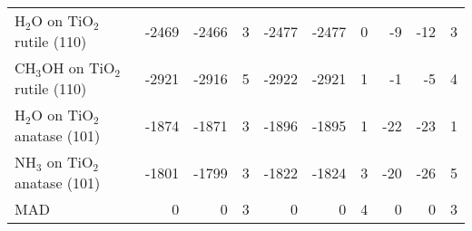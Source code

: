 \begin{table}
\begin{adjustbox}{center,max width=1\textwidth}
\begin{tabular}{lrrrrrrrrr}
H$_2$O on TiO$_2$ rutile (110) & -2469 & -2466 & 3 & -2477 & -2477 & 0 & -9 & -12 & 3 \\
CH$_3$OH on TiO$_2$ rutile (110) & -2921 & -2916 & 5 & -2922 & -2921 & 1 & -1 & -5 & 4 \\
H$_2$O on TiO$_2$ anatase (101) & -1874 & -1871 & 3 & -1896 & -1895 & 1 & -22 & -23 & 1 \\
NH$_3$ on TiO$_2$ anatase (101) & -1801 & -1799 & 3 & -1822 & -1824 & 3 & -20 & -26 & 5 \\
MAD & 0 & 0 & 3 & 0 & 0 & 4 & 0 & 0 & 3 \\
\bottomrule
\end{tabular}
\end{adjustbox}
\end{table}